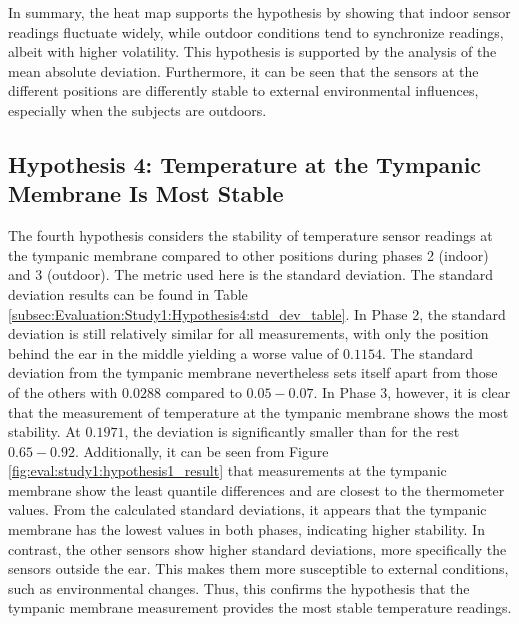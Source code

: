 In summary, the heat map supports the hypothesis by showing that indoor sensor readings fluctuate widely, while outdoor conditions tend to synchronize readings, albeit with higher volatility.
This hypothesis is supported by the analysis of the mean absolute deviation. 
Furthermore, it can be seen that the sensors at the different positions are differently stable to external environmental influences, especially when the subjects are outdoors.

\subsection{Hypothesis 4: Temperature at the Tympanic Membrane Is Most Stable}
\label{subsec:Evaluation:Study1:Hypothesis4}
The fourth hypothesis considers the stability of temperature sensor readings at the tympanic membrane compared to other positions during phases 2 (indoor) and 3 (outdoor).
The metric used here is the standard deviation. 
The standard deviation results can be found in Table \ref{subsec:Evaluation:Study1:Hypothesis4:std_dev_table}. 
In Phase 2, the standard deviation is still relatively similar for all measurements, with only the position behind the ear in the middle yielding a worse value of $0.1154$. 
The standard deviation from the tympanic membrane nevertheless sets itself apart from those of the others with $0.0288$ compared to $0.05-0.07$. 
In Phase 3, however, it is clear that the measurement of temperature at the tympanic membrane shows the most stability. 
At $0.1971$, the deviation is significantly smaller than for the rest $0.65-0.92$. 
Additionally, it can be seen from Figure \ref{fig:eval:study1:hypothesis1_result} that measurements at the tympanic membrane show the least quantile differences and are closest to the thermometer values. 
From the calculated standard deviations, it appears that the tympanic membrane has the lowest values in both phases, indicating higher stability. 
In contrast, the other sensors show higher standard deviations, more specifically the sensors outside the ear. 
This makes them more susceptible to external conditions, such as environmental changes.
Thus, this confirms the hypothesis that the tympanic membrane measurement provides the most stable temperature readings.

